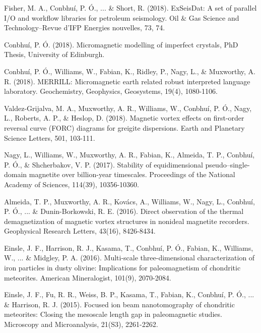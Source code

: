 \documentclass[11pt]{article}
\newenvironment{resumeSubSectionBody}{
    \par
    \vspace{-0.2\parskip}
    \begin{small}
    \par
} {
    \par
    \end{small}
    \par
}
\begin{document}
%
%
\begin{resumeSubSectionBody}

    Fisher, M. A., Conbhuí, P. Ó., ... {\&} Short, R. (2018). ExSeisDat: A set of parallel I/O and
    workflow libraries for petroleum seismology. Oil {\&} Gas Science and
    Technology–Revue d’IFP Energies nouvelles, 73, 74.

    Conbhuí, P. Ó. (2018). Micromagnetic modelling of imperfect crystals, PhD
    Thesis, University of Edinburgh.

    Conbhuí, P. Ó., Williams, W., Fabian, K., Ridley, P., Nagy, L., {\&}
    Muxworthy, A. R. (2018). MERRILL: Micromagnetic earth related robust
    interpreted language laboratory. Geochemistry, Geophysics, Geosystems,
    19(4), 1080-1106.

    Valdez-Grijalva, M. A., Muxworthy, A. R., Williams, W., Conbhuí, P. Ó.,
    Nagy, L., Roberts, A. P., {\&} Heslop, D. (2018). Magnetic vortex effects on
    first-order reversal curve (FORC) diagrams for greigite dispersions. Earth
    and Planetary Science Letters, 501, 103-111.

    Nagy, L., Williams, W., Muxworthy, A. R., Fabian, K., Almeida, T. P.,
    Conbhuí, P. Ó., {\&} Shcherbakov, V. P. (2017). Stability of equidimensional
    pseudo–single-domain magnetite over billion-year timescales. Proceedings of
    the National Academy of Sciences, 114(39), 10356-10360.

    Almeida, T. P., Muxworthy, A. R., Kov\'acs, A., Williams, W., Nagy, L.,
    Conbhu\'i, P. \'O., ... {\&} Dunin-Borkowski, R. E. (2016). Direct
    observation of the thermal demagnetization of magnetic vortex structures in
    nonideal magnetite recorders. Geophysical Research Letters, 43(16),
    8426-8434.

    Einsle, J. F., Harrison, R. J., Kasama, T., Conbhu\'i, P. \'O., Fabian, K.,
    Williams, W., ... {\&} Midgley, P. A. (2016). Multi-scale three-dimensional
    characterization of iron particles in dusty olivine: Implications for
    paleomagnetism of chondritic meteorites. American Mineralogist, 101(9),
    2070-2084.

    Einsle, J. F., Fu, R. R., Weiss, B. P., Kasama, T., Fabian, K., Conbhu\'i,
    P.  \'O., ... {\&} Harrison, R. J. (2015). Focused ion beam nanotomography
    of chondritic meteorites: Closing the mesoscale length gap in paleomagnetic
    studies. Microscopy and Microanalysis, 21(S3), 2261-2262.

\end{resumeSubSectionBody}


\end{document}

